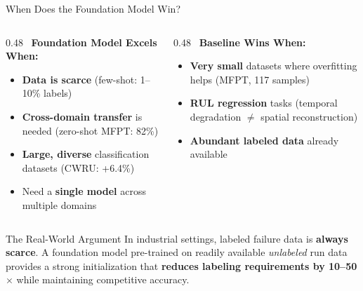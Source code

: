 \documentclass[aspectratio=169, 11pt]{beamer}
\begin{document}
\begin{frame}{When Does the Foundation Model Win?}

\begin{columns}[T]
\begin{column}{0.48\textwidth}
\textcolor{good}{\faCheckCircle\ \textbf{Foundation Model Excels When:}}
\begin{itemize}
    \item \textbf{Data is scarce} (few-shot: 1--10\% labels)
    \item \textbf{Cross-domain transfer} is needed (zero-shot MFPT: 82\%)
    \item \textbf{Large, diverse} classification datasets (CWRU: +6.4\%)
    \item Need a \textbf{single model} across multiple domains
\end{itemize}
\end{column}
\begin{column}{0.48\textwidth}
\textcolor{bad}{\faTimesCircle\ \textbf{Baseline Wins When:}}
\begin{itemize}
    \item \textbf{Very small} datasets where overfitting helps (MFPT, 117 samples)
    \item \textbf{RUL regression} tasks (temporal degradation $\neq$ spatial reconstruction)
    \item \textbf{Abundant labeled data} already available
\end{itemize}
\end{column}
\end{columns}

\vspace{0.4cm}
\begin{block}{The Real-World Argument}
In industrial settings, labeled failure data is \textbf{always scarce}. A foundation model pre-trained on readily available \emph{unlabeled} run data provides a strong initialization that \textbf{reduces labeling requirements by 10--50$\times$} while maintaining competitive accuracy.
\end{block}
\end{frame}

\end{document}

